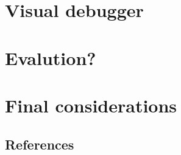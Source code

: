 \documentclass{ufscThesis}
\begin{document}
\chapter{Visual debugger}


\chapter{Evalution?}


\chapter{Final considerations}





\section{References}



\end{document}

